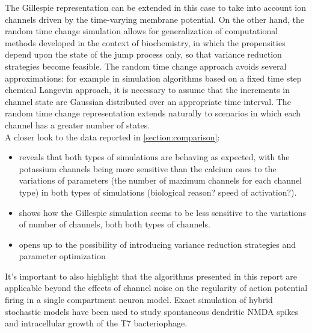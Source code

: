 The Gillespie representation can be extended in this case to take into account ion channels driven by the time-varying membrane potential. On the other hand, the random time change simulation allows for generalization of computational methods developed in the context of biochemistry, in which the propensities depend upon the state of the jump process only, so that variance reduction strategies become feasible. The random time change approach avoids several approximations: for example in simulation algorithms based on a fixed time step chemical Langevin approach, it is necessary to assume that the increments in channel state are Gaussian distributed over an appropriate time interval. The random time change representation extends naturally to scenarios in which each channel has a greater number of states. \\

A closer look to the data reported in \ref{section:comparison}: 
\begin{itemize}
	\item reveals that both types of simulations are behaving as expected, with the potassium channels being more sensitive than the calcium ones to the variations of parameters (the number of maximum channels for each channel type) in both types of simulations (biological reason? speed of activation?). 
	\item shows how the Gillespie simulation seems to be less sensitive to the variations of number of channels, both both types of channels.\\
	\item opens up to the possibility of introducing variance reduction strategies and parameter optimization
\end{itemize}

It's important to also highlight that the algorithms presented in this report are applicable beyond the effects of channel noise on the regularity of action potential firing in a single compartment neuron model. Exact simulation of hybrid stochastic models have been used to study spontaneous dendritic NMDA spikes and intracellular growth of the T7 bacteriophage. 


